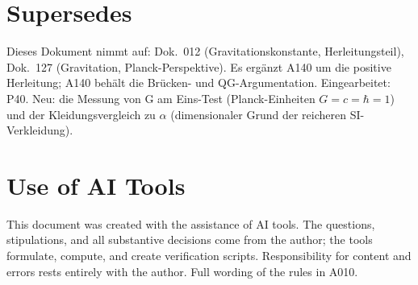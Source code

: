 \section{Supersedes}

Dieses Dokument nimmt auf: Dok.~012 (Gravitationskonstante, Herleitungsteil),
Dok.~127 (Gravitation, Planck-Perspektive). Es ergänzt A140 um die positive
Herleitung; A140 behält die Brücken- und QG-Argumentation.
Eingearbeitet: P40. Neu: die Messung von G am Eins-Test (Planck-Einheiten $G=c=\hbar=1$) und der Kleidungsvergleich zu $\alpha$ (dimensionaler Grund der reicheren SI-Verkleidung).

\section{Use of AI Tools}

This document was created with the assistance of AI tools. The questions,
stipulations, and all substantive decisions come from the author; the tools
formulate, compute, and create verification scripts.
Responsibility for content and errors rests entirely with the author.
Full wording of the rules in A010.
